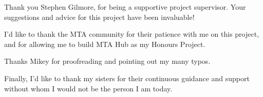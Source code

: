 \begin{acknowledgements}
    Thank you Stephen Gilmore, for being a supportive project supervisor. Your suggestions and advice for this project have been invaluable!


    I'd like to thank the MTA community for their patience with me on this project, and for allowing me to build MTA Hub as my Honours Project.

    Thanks Mikey for proofreading and pointing out my many typos.

    Finally, I'd like to thank my sisters for their continuous guidance and support without whom I would not be the person I am today.
\end{acknowledgements}
